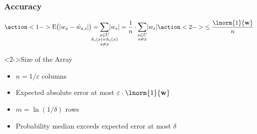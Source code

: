 \begin{frame}
  \frametitle{Accuracy}

  \begin{equation*}
    \action<1->{\expectation \bigl( \absolute{w_{x} - \hat{w}_{x, i}} \bigr) = \smashoperator{\sum_{\substack{s \in U \\ h_{i} (s) = h_{i} (x) \\ s \neq x}}} \absolute{w_{s}} = \frac{1}{n} \cdot \smashoperator{\sum_{\substack{s \in U \\ s \neq x}}} \absolute{w_{s}}}
    \action<2->{\leq \frac{\lnorm{1}{\mathvector{w}}}{n}}
  \end{equation*}

  \begin{block}<2->{Size of the Array}
    \begin{itemize}
      \item \( n = 1 / \varepsilon \) columns
      \item Expected absolute error at most \( \varepsilon \cdot \lnorm{1}{\mathvector{w}} \)
      \item \( m = \ln (1 / \delta) \) rows
      \item Probability median exceeds expected error at most \( \delta \)
    \end{itemize}
  \end{block}
\end{frame}
